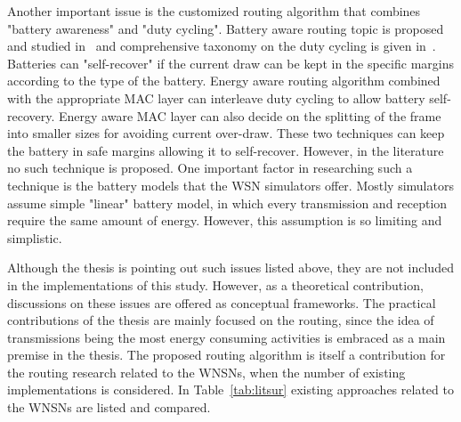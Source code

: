 \documentclass[12pt, oneandhalf, chaparabic, sees, ms]{metu}
\begin{document}
Another important issue is the customized routing algorithm that combines "battery awareness" and "duty cycling". 
Battery aware routing topic is proposed and studied in~\cite{ma2005} and comprehensive taxonomy on the duty cycling is given 
in~\cite{carrano2014}. Batteries can "self-recover" if the current draw can be kept in the specific margins according to the 
type of the battery. Energy aware routing algorithm combined with the appropriate MAC layer can interleave duty cycling to
allow battery self-recovery. Energy aware MAC layer can also decide on the splitting of the frame into smaller sizes for avoiding
current over-draw. These two techniques can keep the battery in safe margins allowing it to self-recover. However, in the literature
no such technique is proposed. One important factor in researching such a technique is the battery models that the WSN simulators offer.
Mostly simulators assume simple "linear" battery model, in which every transmission and reception require the same amount of energy.
However, this assumption is so limiting and simplistic. 


Although the thesis is pointing out such issues listed above, they are not included in the implementations of this study. 
However, as a theoretical contribution, discussions on these issues are offered as conceptual frameworks.
The practical contributions of the thesis are mainly focused on the routing,
since the idea of transmissions being the most energy consuming activities is embraced as a main premise in the thesis.
The proposed routing algorithm is itself a contribution for the routing research related to the WNSNs,
when the number of existing implementations is considered. In Table~\ref{tab:litsur}
existing approaches related to the WNSNs are listed and compared.
\end{document}
